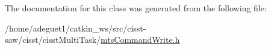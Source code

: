 The documentation for this class was generated from the following file\-:\begin{DoxyCompactItemize}
\item 
/home/adeguet1/catkin\-\_\-ws/src/cisst-\/saw/cisst/cisst\-Multi\-Task/\hyperlink{mts_command_write_8h}{mts\-Command\-Write.\-h}\end{DoxyCompactItemize}
